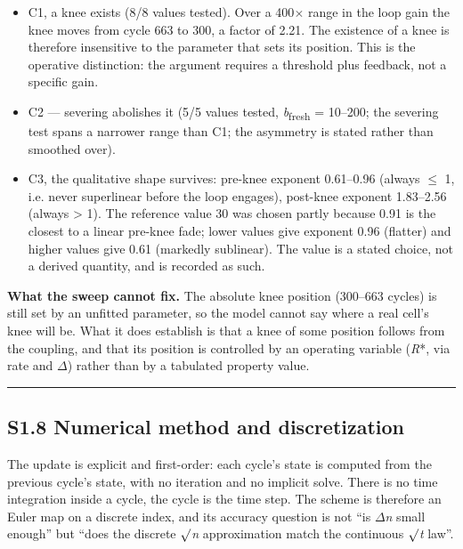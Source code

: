 \documentclass[11pt,a4paper]{article}
\begin{document}
\begin{itemize}
  \item C1, a knee exists (8/8 values tested). Over a 400\ensuremath{\times} range in the loop gain the knee moves from cycle 663 to 300, a factor of 2.21. The existence of a knee is therefore insensitive to the parameter that sets its position. This is the operative distinction: the argument requires a threshold plus feedback, not a specific gain.
  \item C2 --- severing abolishes it (5/5 values tested, \emph{b}\textsubscript{fresh} = 10--200; the severing test spans a narrower range than C1; the asymmetry is stated rather than smoothed over).
  \item C3, the qualitative shape survives: pre-knee exponent 0.61--0.96 (always \ensuremath{\leq} 1, i.e. never superlinear before the loop engages), post-knee exponent 1.83--2.56 (always > 1). The reference value 30 was chosen partly because 0.91 is the closest to a linear pre-knee fade; lower values give exponent 0.96 (flatter) and higher values give 0.61 (markedly sublinear). The value is a stated choice, not a derived quantity, and is recorded as such.
\end{itemize}


\textbf{What the sweep cannot fix.} The absolute knee position (300--663 cycles) is still set by an unfitted parameter, so the model cannot say where a real cell's knee will be. What it does establish is that a knee of some position follows from the coupling, and that its position is controlled by an operating variable (\emph{R}*, via rate and \ensuremath{\Delta}) rather than by a tabulated property value.


\par\noindent\rule{\linewidth}{0.4pt}\par


\subsection*{S1.8 Numerical method and discretization}


The update is explicit and first-order: each cycle's state is computed from the previous cycle's state, with no iteration and no implicit solve. There is no time integration inside a cycle, the cycle is the time step. The scheme is therefore an Euler map on a discrete index, and its accuracy question is not \textquotedblleft{}is \ensuremath{\Delta}\emph{n} small enough\textquotedblright{} but \textquotedblleft{}does the discrete \ensuremath{\surd}\emph{n} approximation match the continuous \ensuremath{\surd}\emph{t} law\textquotedblright{}.
\end{document}
